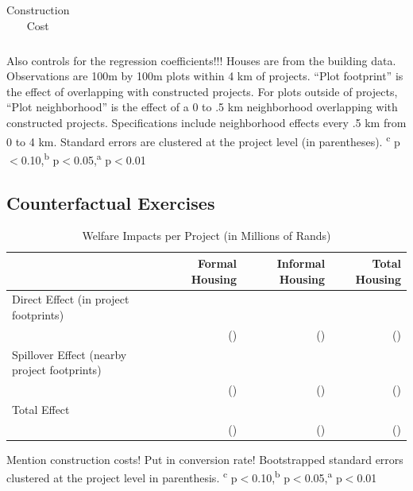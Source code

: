 \documentclass[12pt]{article}
\newcommand{\regtext}{
	Observations are 100m by 100m plots within 4 km of projects.  
``Plot footprint'' is the effect of overlapping with constructed projects.  
For plots outside of projects, ``Plot neighborhood'' is the effect of a 0 to .5 km neighborhood overlapping with constructed projects.  Specifications include neighborhood effects every .5 km from 0 to 4 km.
Standard errors are clustered at the project level (in parentheses). 
\textsuperscript{c} p$<$0.10,\textsuperscript{b} p$<$0.05,\textsuperscript{a} p$<$0.01 \,\,
}
\begin{document}
\begin{table}
\small
\centering
\caption{Construction Cost}\label{table:ccost}
\vspace{-2mm}
\begin{threeparttable}
\begin{tabular}{lCCCCC}
\toprule

\bottomrule
\end{tabular}
\begin{tablenotes}
\item \footnotesize  Also controls for the regression coefficients!!! Houses are from the building data. \regtext
\end{tablenotes}
\end{threeparttable}
\end{table}


\subsection{Counterfactual Exercises}

\begin{table}[h]
\centering
\caption{Welfare Impacts per Project (in Millions of Rands)}\label{table:welfare}
\vspace{-2mm}
\begin{threeparttable}
\begin{tabular}{lDDD}
\toprule
  &    Formal Housing  &  Informal Housing & Total Housing \\ \midrule 
Direct Effect (in project footprints) &   &  &  \\
 & (\unskip) & (\unskip) & (\unskip) \\[.5em]
Spillover Effect (nearby project footprints) &   &  &  \\
 & (\unskip) & (\unskip) & (\unskip) \\[.5em]
Total Effect &  &  &  \\
&  (\unskip) & (\unskip) & (\unskip) \\[.5em]
\bottomrule
\end{tabular}
\begin{tablenotes}
\item \footnotesize Mention construction costs! Put in conversion rate!  Bootstrapped standard errors clustered at the project level in parenthesis. \textsuperscript{c} p$<$0.10,\textsuperscript{b} p$<$0.05,\textsuperscript{a} p$<$0.01 \,\,  
\end{tablenotes}
\end{threeparttable}
\end{table}
\end{document}
